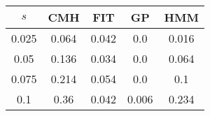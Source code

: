 \centering \begin{tabular}{c|c|c|c|c}
$s$	&CMH	&FIT	&GP	&HMM\\\hline
0.025	&0.064	&0.042	&0.0	&0.016\\
0.05	&0.136	&0.034	&0.0	&0.064\\
0.075	&0.214	&0.054	&0.0	&0.1\\
0.1	&0.36	&0.042	&0.006	&0.234\\
\end{tabular}
